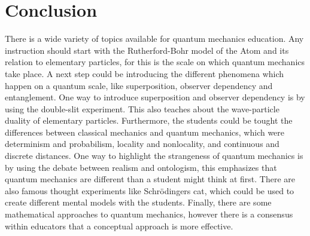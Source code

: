 \documentclass[11pt,twoside]{report} %
\begin{document}
\section{Conclusion}

There is a wide variety of topics available for quantum mechanics education. Any instruction should start with the Rutherford-Bohr model of the Atom and its relation to elementary particles, for this is the scale on which quantum mechanics take place. A next step could be introducing the different phenomena which happen on a quantum scale, like superposition, observer dependency and entanglement. One way to introduce superposition and observer dependency is by using the double-slit experiment. This also teaches about the wave-particle duality of elementary particles. Furthermore, the students could be tought the differences between classical mechanics and quantum mechanics, which were determinism and probabilism, locality and nonlocality, and continuous and discrete distances. One way to highlight the strangeness of quantum mechanics is by using the debate between realism and ontologism, this emphasizes that quantum mechanics are different than a student might think at first. There are also famous thought experiments like Schrödingers cat, which could be used to create different mental models with the students. Finally, there are some mathematical approaches to quantum mechanics, however there is a consensus within educators that a conceptual approach is more effective.



\end{document}
